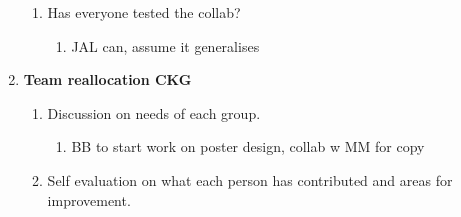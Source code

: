 \begin{enumerate}
\begin{enumerate}
\item  Has everyone tested the collab?

\begin{enumerate}
\item  JAL can, assume it generalises\\
\end{enumerate}
\end{enumerate}

\item  \textbf{Team reallocation CKG}

\begin{enumerate}
\item \textbf{ }Discussion on needs of each group.

\begin{enumerate}
\item  BB to start work on poster design, collab w MM for copy
\end{enumerate}

\item  Self evaluation on what each person has contributed and areas for improvement.
\end{enumerate}
\end{enumerate}



